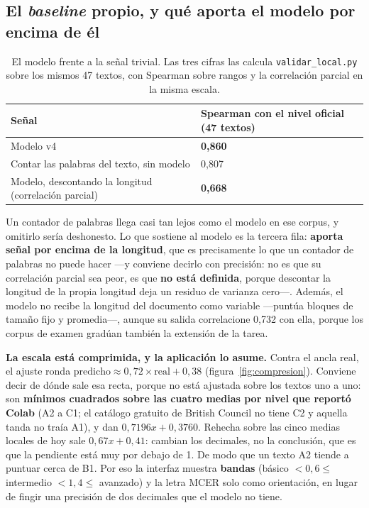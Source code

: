\documentclass[11pt,a4paper]{article}
\newcommand{\cod}[1]{\texttt{\small #1}}
\begin{document}
\subsection{El \emph{baseline} propio, y qué aporta el modelo por encima de él}
\label{sec:baseline}

\begin{table}[htbp]
\centering
\small
\begin{tabular}{@{}L{7.6cm} R{5.4cm}@{}}
\toprule
\textbf{Señal} & \textbf{Spearman con el nivel oficial (47 textos)} \\
\midrule
Modelo v4 & \textbf{0,860} \\
Contar las palabras del texto, sin modelo & 0,807 \\
Modelo, descontando la longitud (correlación parcial) & \textbf{0,668} \\
\bottomrule
\end{tabular}
\caption{El modelo frente a la señal trivial. Las tres cifras las calcula \cod{validar\_local.py} sobre los mismos 47 textos, con Spearman sobre rangos y la correlación parcial en la misma escala.}
\label{cuad:baseline}
\end{table}

Un contador de palabras llega casi tan lejos como el modelo en ese corpus, y omitirlo
sería deshonesto. Lo que sostiene al modelo es la tercera fila: \textbf{aporta señal por
encima de la longitud}, que es precisamente lo que un contador de palabras no puede
hacer —y conviene decirlo con precisión: no es que su correlación parcial sea peor, es que
\textbf{no está definida}, porque descontar la longitud de la propia longitud deja un
residuo de varianza cero—. Además, el modelo no recibe la longitud del documento como
variable —puntúa
bloques de tamaño fijo y promedia—, aunque su salida correlacione 0,732 con ella, porque
los corpus de examen gradúan también la extensión de la tarea.

\textbf{La escala está comprimida, y la aplicación lo asume.} Contra el ancla real, el
ajuste ronda $\text{predicho} \approx 0{,}72 \times \text{real} + 0{,}38$
(figura~\ref{fig:compresion}). Conviene decir de dónde sale esa recta, porque no está
ajustada sobre los textos uno a uno: son \textbf{mínimos cuadrados sobre las cuatro medias
por nivel que reportó Colab} (A2 a C1; el catálogo gratuito de British Council no tiene C2
y aquella tanda no traía A1), y dan $0{,}7196x + 0{,}3760$. Rehecha sobre las cinco medias
locales de hoy sale $0{,}67x + 0{,}41$: cambian los decimales, no la conclusión, que es que
la pendiente está muy por debajo de 1. De modo que un texto A2 tiende a puntuar cerca de
B1. Por
eso la interfaz muestra \textbf{bandas} (básico $< 0{,}6 \leq$ intermedio $< 1{,}4 \leq$
avanzado) y la letra MCER solo como orientación, en lugar de fingir una precisión de dos
decimales que el modelo no tiene.
\end{document}
